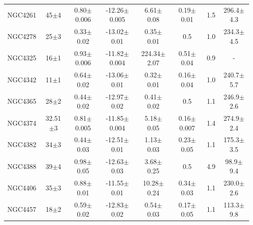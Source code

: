 \documentclass[iop]{emulateapj}
\begin{document}
\begin{table}
\begin{tabular}{lccccccc}
NGC4261 & 45$\pm$4 & 0.80$\pm$0.006 & -12.26$\pm$0.005 & 6.61$\pm$0.08 & 0.19$\pm$0.01 & 1.5  & 296.4$\pm$4.3\\
NGC4278 & 25$\pm$3 & 0.33$\pm$0.02  & -13.02$\pm$0.01 & 0.35$\pm$0.01 & 0.5 & 1.0  & 234.3$\pm$4.5\\
NGC4325 & 16$\pm$1 & 0.93$\pm$0.006 & -11.82$\pm$0.004 & 224.34$\pm$2.07 & 0.51$\pm$0.04 & 0.9 & - \\
NGC4342 & 11$\pm$1 & 0.64$\pm$0.02 & -13.06$\pm$0.01 & 0.32$\pm$0.01 & 0.16$\pm$0.04 & 1.0  & 240.7$\pm$5.7 \\
NGC4365 & 28$\pm$2 & 0.44$\pm$0.02 &  -12.97$\pm$0.02 & 0.41$\pm$0.02 & 0.5 & 1.1  & 246.9$\pm$2.6\\
NGC4374 & 32.51$\pm$3 & 0.81$\pm$0.005  & -11.85$\pm$0.004 & 5.18$\pm$0.05 & 0.16$\pm$0.007 & 1.4  & 274.9$\pm$2.4 \\
NGC4382 & 34$\pm$3 & 0.44$\pm$0.03  & -12.51$\pm$0.01 & 1.13$\pm$0.03 & 0.23$\pm$0.05 & 1.1  & 175.3$\pm$3.5 \\
NGC4388 & 39$\pm$4 & 0.98$\pm$0.05  & -12.63$\pm$0.03 & 3.68$\pm$0.25 & 0.5 & 4.9  & 98.9$\pm$9.4\\
NGC4406 & 35$\pm$3 & 0.88$\pm$0.01 & -11.55$\pm$0.01 & 10.28$\pm$0.24 & 0.34$\pm$0.03 & 1.1  & 230.0$\pm$2.6 \\
NGC4457 & 18$\pm$2 & 0.59$\pm$0.02  & -12.83$\pm$0.02 & 0.54$\pm$0.03 & 0.17$\pm$0.05 & 1.1  & 113.3$\pm$9.8\\
\hline
\end{tabular}
\end{table}
\end{document}
